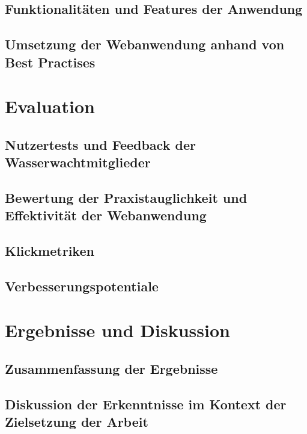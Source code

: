 \documentclass[fontsize=12pt,openright,oneside,paper=a4,BCOR=1cm]{scrbook}
\begin{document}
\section{Funktionalitäten und Features der Anwendung}

\section{Umsetzung der Webanwendung anhand von Best Practises}


%
%

\renewcommand{\cleardoublepage}{}
\chapter{Evaluation}

\section{Nutzertests und Feedback der Wasserwachtmitglieder}

\section{Bewertung der Praxistauglichkeit und Effektivität der Webanwendung}

\section{Klickmetriken}

\section{Verbesserungspotentiale}

%
%

\renewcommand{\cleardoublepage}{}
\chapter{Ergebnisse und Diskussion}

\section{Zusammenfassung der Ergebnisse}

\section{Diskussion der Erkenntnisse im Kontext der Zielsetzung der Arbeit}
\end{document}
